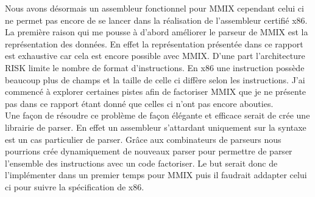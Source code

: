 \documentclass {article}
\theoremstyle{definition}
\theoremstyle{remark}
\begin{document}
Nous avons désormais un assembleur fonctionnel pour MMIX cependant celui ci ne permet pas encore de se lancer
dans la réalisation de l'assembleur certifié x86.\\
La première raison qui me pousse à d'abord améliorer le parseur de MMIX est la représentation des données.
En effet la représentation présentée dans ce rapport est exhaustive car cela est encore possible avec
MMIX. D'une part l'architecture RISK limite le nombre de format d'instructions. En x86 une instruction possède
beaucoup plus de champs et la taille de celle ci diffère selon les instructions. J'ai commencé à explorer certaines
pistes afin de factoriser MMIX que je ne présente pas dans ce rapport étant donné que celles ci n'ont pas encore abouties.
\\
Une façon de résoudre ce problème de façon élégante et efficace serait de crée une librairie de parser.
En effet un assembleur s'attardant uniquement sur la syntaxe est un cas particulier de parser.
Grâce aux combinateurs de parseurs nous pourrions crée dynamiquement de nouveaux parser pour
permettre de parser l'ensemble des instructions avec un code factoriser. Le but serait donc de l'implémenter
dans un premier temps pour MMIX puis il faudrait addapter celui ci pour suivre la spécification de x86.
\end{document}

